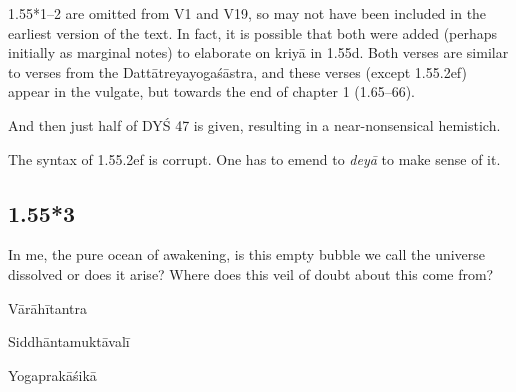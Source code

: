\begin{ekdosis}
\begin{testimonia}[hp01_055_1]
\end{testimonia}

\begin{philcomm}[hp01_055_1]
1.55*1–2 are omitted from V1 and V19, so may not have been included in the earliest version of the text. In fact, it is possible that both were added (perhaps initially as marginal notes) to elaborate on kriyā in 1.55d. Both verses are similar to verses from the Dattātreyayogaśāstra, and these verses (except 1.55.2ef) appear in the vulgate, but towards the end of chapter 1 (1.65–66).

And then just half of DYŚ 47 is given, resulting in a near-nonsensical hemistich.

The syntax of 1.55.2ef is corrupt. One has to emend to \emph{deyā} to make sense of it.
\end{philcomm}

\subsection*{1.55*3}
\begin{translation}[hp01_055_3]
In me, the pure ocean of awakening, is this empty bubble we call the universe dissolved or does it arise? Where does this veil of doubt about this come from?
\end{translation}

\begin{testimonia}[hp01_055_3]
Vārāhītantra

\begin{versinnote}
\end{versinnote}

Siddhāntamuktāvalī

\begin{versinnote}
\end{versinnote}

Yogaprakāśikā

\begin{versinnote}
\end{versinnote}


\end{testimonia}
\end{ekdosis}
